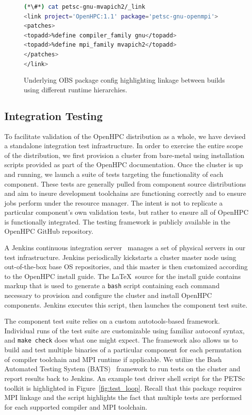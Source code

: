 \documentclass{sig-alternate-05-2015}
\begin{document}
\begin{figure}[h]
\begin{lstlisting}[language=bash,keywords={},basicstyle=\fontsize{7.8}{10}\ttfamily,keepspaces]
(*\#*) cat petsc-gnu-mvapich2/_link
<link project='OpenHPC:1.1' package='petsc-gnu-openmpi'>
<patches>
<topadd>%define compiler_family gnu</topadd>
<topadd>%define mpi_family mvapich2</topadd>
</patches>
</link>
\end{lstlisting}
\vspace*{-0.3cm}
\caption{Underlying OBS package config highlighting linkage between builds
  using different runtime hierarchies.}
\label{fig:obs_link}
\end{figure}

\subsection{Integration Testing} \label{sec:integ_testing}
To facilitate validation of the OpenHPC distribution as a whole, we have
devised a standalone integration test infrastructure. In order to exercise the
entire scope of the distribution, we first provision a cluster from bare-metal
using installation scripts provided as part of the OpenHPC documentation. Once
the cluster is up and running, we launch a suite of tests targeting the
functionality of each component. These tests are generally
pulled from component source distributions and aim to insure development
toolchains are functioning correctly and to ensure jobs perform under the
resource manager. The intent is not to replicate a particular component's own
validation tests, but rather to ensure all of OpenHPC is functionally
integrated. The testing framework is publicly available in the OpenHPC GitHub
repository.

A Jenkins continuous integration server~\cite{jenkins_url} manages a set of 
physical servers in our test infrastructure. Jenkins periodically kickstarts a cluster 
master node using out-of-the-box base OS repositories, and this master is then 
customized according to the OpenHPC install guide. The \LaTeX\ source for the 
install guide contains markup that is used to generate a \texttt{{bash}} script 
containing each command necessary to provision and configure the cluster and install OpenHPC
components. Jenkins executes this script, then launches the component test suite.

The component test suite relies on a custom autotools-based framework.
Individual runs of the test suite are customizable using familiar autoconf
syntax, and \texttt{{make check}} does what one might expect. The framework
also allows us to build and test multiple binaries of a particular component
for each permutation of compiler toolchain and MPI runtime if applicable.  We
utilize the Bash Automated Testing System (BATS)~\cite{bats_url} framework to
run tests on the cluster and report results back to Jenkins. An example test
driver shell script for the PETSc toolkit is highlighted in Figure~\ref{fig:test_loop}. Recall that this package
requires MPI linkage and the script highlights the fact that multiple tests are
performed for each supported compiler and MPI toolchain.
\end{document}
